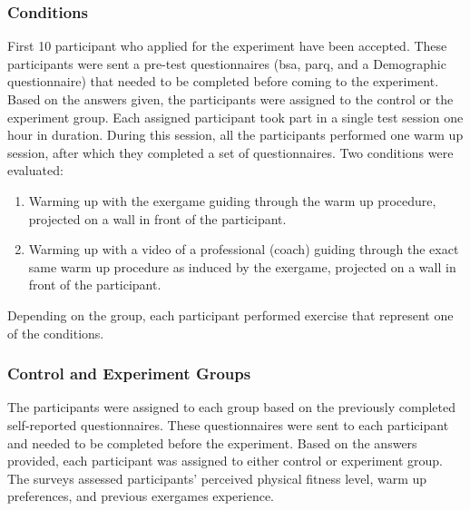 \subsubsection{Conditions}
First 10 participant who applied for the experiment have been accepted. These participants were sent a pre-test questionnaires (\acrshort{bsa}, \acrshort{parq}, and a Demographic questionnaire) that needed to be completed before coming to the experiment. Based on the answers given, the participants were assigned to the control or the experiment group. Each assigned participant took part in a single test session one hour in duration. During this session, all the participants  performed one warm up session, after which they completed a set of questionnaires. Two conditions were evaluated:
\begin{enumerate}
\item Warming up with the exergame guiding through the warm up procedure, projected on a wall in front of the participant.
\item Warming up with a video of a professional (coach) guiding through the exact same warm up procedure as induced by the exergame, projected on a wall in front of the participant.
\end{enumerate}
Depending on the group, each participant performed exercise that represent one of the conditions.
\subsubsection{Control and Experiment Groups}
The participants were assigned to each group based on the previously completed self-reported questionnaires. These questionnaires were sent to each participant and needed to be completed before the experiment. Based on the answers provided, each participant was assigned to either control or experiment group. The surveys assessed participants' perceived physical fitness level, warm up preferences, and previous exergames experience.

